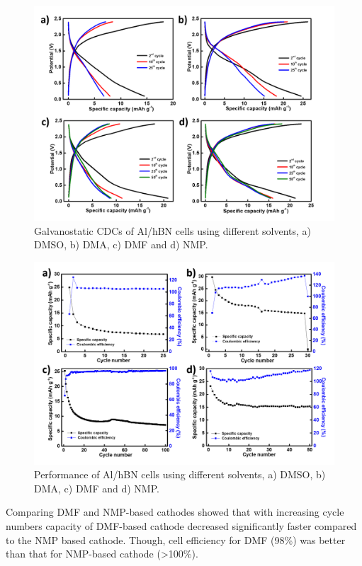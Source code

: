 \begin{figure}[tbh!]
\centering
\includegraphics[width=\textwidth]{Figures/chap7fig/hBNsolvents}
\caption{Galvanostatic CDCs of Al/hBN cells using different solvents, a) DMSO, b) DMA, c) DMF and d) NMP.}
\label{Figures/chap7fig:hBNsolvents}
\end{figure}

\begin{figure}[tbh!]
\centering
\includegraphics[width=\textwidth]{Figures/chap7fig/hBNsolventsCE}
\caption{Performance of Al/hBN cells using different solvents, a) DMSO, b) DMA, c) DMF and d) NMP.}
\label{Figures/chap7fig:hBNsolventsCE}
\end{figure}

Comparing DMF and NMP-based cathodes showed that with increasing cycle numbers capacity of DMF-based cathode decreased significantly faster compared to the NMP based cathode. Though, cell efficiency for DMF (98\%) was better than that for NMP-based cathode (>100\%).

